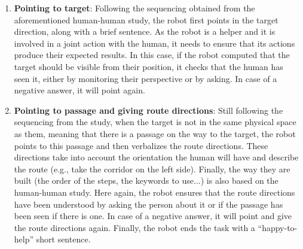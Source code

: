 \documentclass[a4paper,11pt,twoside]{StyleThese}
\begin{document}
\begin{enumerate}
	\item \textbf{Pointing to target}: Following the sequencing obtained from the aforementioned human-human study, the robot first points in the target direction, along with a brief sentence. As the robot is a helper and it is involved in a joint action with the human, it needs to ensure that its actions produce their expected results. In this case, if the robot computed that the target should be visible from their position, it checks that the human has seen it, either by monitoring their perspective or by asking. In case of a negative answer, it will point again.\label{steps:ensuring}
	\item \textbf{Pointing to passage and giving route directions}: Still following the sequencing from the study, when the target is not in the same physical space as them, meaning that there is a passage on the way to the target, the robot points to this passage and then verbalizes the route directions. These directions take into account the orientation the human will have and describe the route (e.g., take the corridor on the left side). Finally, the way they are built (\ie the order of the steps, the keywords to use...) is also based on the human-human study. Here again, the robot ensures that the route directions have been understood by asking the person about it or if the passage has been seen if there is one.
	In case of a negative answer, it will point and give the route directions again. Finally, the robot ends the task with a ``happy-to-help'' short sentence.\label{steps:passage}
\end{enumerate}
\end{document}
